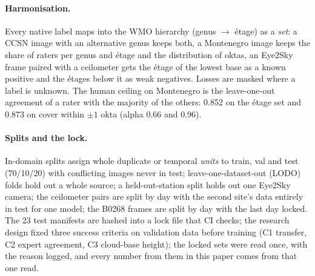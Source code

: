 \paragraph{Harmonisation.} Every native label maps into the WMO hierarchy (genus $\rightarrow$ \'etage) as a
\emph{set}: a CCSN image with an alternative genus keeps both, a Montenegro image keeps the share of raters per
genus and \'etage and the distribution of oktas, an Eye2Sky frame paired with a ceilometer gets the \'etage of the
lowest base as a known positive and the \'etages below it as weak negatives. Losses are masked where a label is
unknown. The human ceiling on Montenegro is the leave-one-out agreement of a rater with the majority of the
others: 0.852 on the \'etage set and 0.873 on cover within $\pm1$ okta (alpha 0.66 and 0.96).

\paragraph{Splits and the lock.} In-domain splits assign whole duplicate or temporal \emph{units} to train, val
and test (70/10/20) with conflicting images never in test; leave-one-dataset-out (LODO) folds hold out a whole
source; a held-out-station split holds out one Eye2Sky camera; the ceilometer pairs are split by day with the second
site's data entirely in test for one model; the B0268 frames are split by day with the last day locked. The 23 test
manifests are hashed into a lock file that CI checks; the research design fixed three success criteria on
validation data before training (C1 transfer, C2 expert agreement, C3 cloud-base height); the locked sets were
read once, with the reason logged, and every number from them in this paper comes from that one read.
